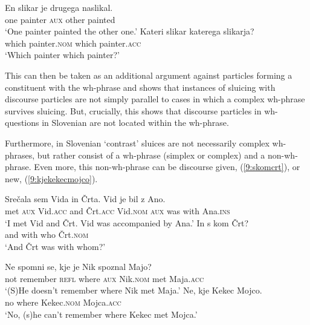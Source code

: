 \documentclass[output=paper,modfonts,newtxmath,hidelinks]{langscibook}
\begin{document}
\begin{exe}
\ex \begin{xlist}
\ex \gll En slikar je drugega naslikal.\\
one painter \textsc{aux} other 	painted\\
\trans `One painter painted the other one.'	 
\ex \label{9:katerikaterega}
\gll	Kateri slikar katerega slikarja?\\
which painter.\textsc{nom} which painter.\textsc{acc}\\
\trans `Which painter which painter?'
\end{xlist}\end{exe}

\noindent This can then be taken as an additional argument against particles forming a constituent with the wh-phrase and shows that instances of sluicing with  discourse particles are not simply parallel to cases in which a complex wh-phrase survives sluicing. But, crucially, this shows that discourse particles in wh-questions in Slovenian are not located within the wh-phrase. 

Furthermore, in Slovenian `contrast' sluices are not necessarily complex wh-phrases, but rather consist of a wh-phrase (simplex or complex) and a non-wh-phrase. Even more, this non-wh-phrase can be discourse given, (\ref{9:skomcrt}), or new, (\ref{9:kjekekecmojco}).

\begin{exe}
\ex \begin{xlist}
\ex \gll Srečala sem Vida in Črta. Vid je bil z Ano.\\
met \textsc{aux} Vid.\textsc{acc} and Črt.\textsc{acc}  Vid.\textsc{nom} \textsc{aux} was with Ana.\textsc{ins} \\
\trans `I met Vid and Črt. Vid was accompanied by Ana.' 
\ex \gll In s kom Črt? \\
	and with who Črt.\textsc{nom}\\
\trans  `And Črt was with whom?'
\end{xlist}
\label{9:skomcrt}
\ex \begin{xlist}
\ex \gll	Ne spomni se, kje je Nik spoznal Majo? \\
not remember \textsc{refl} where \textsc{aux} Nik.\textsc{nom} met Maja.\textsc{acc}\\
\trans `(S)He doesn't remember where Nik met Maja.'
\ex \gll 	Ne, kje Kekec Mojco.\\
	no where Kekec.\textsc{nom} Mojca.\textsc{acc}\\
\trans 	 `No, (s)he can't remember where Kekec met Mojca.'
\end{xlist}
\label{9:kjekekecmojco}
\end{exe}
\end{document}
